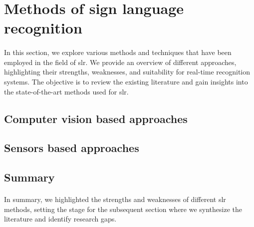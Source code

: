 \section{Methods of sign language recognition}
\paragraph{}
In this section, we explore various methods and techniques that have been employed in the field of \ac{slr}. We provide an overview of different approaches, highlighting their strengths, weaknesses, and suitability for real-time recognition systems. The objective is to review the existing literature and gain insights into the state-of-the-art methods used for \ac{slr}.
\subsection{Computer vision based approaches}
\paragraph{}
\subsection{Sensors based approaches}
\paragraph{}
\subsection{Summary}
\paragraph{}
In summary, we highlighted the strengths and weaknesses of different \ac{slr} methods, setting the stage for the subsequent section where we synthesize the literature and identify research gaps.